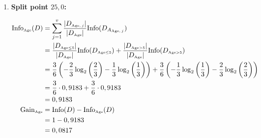 \documentclass[
english,
smallborders
]{i6prcsht}
\newcommand{\OfSpecificValue}[3]{_{\text{\tiny #1#2#3}}}
\newcommand{\OfAttribute}[1]{_{\text{\tiny #1}}}
\begin{document}
\begin{solution}
\begin{enumerate}
\begin{enumerate}
\begin{enumerate}
\begin{enumerate}
					                  \item \textbf{Split point $25,0$:}
					                        
					                        \begin{alignat*}{2}
						                        \text{Info}\OfAttribute{Age}(D) & = \sum_{j=1}^v \frac{|D\OfAttribute{Age$,j$}|}{|D\OfAttribute{Age}|} \text{Info}(D_{A\OfAttribute{Age$,j$}})                                                                                                                            \\
						                                                        & = \frac{|D\OfSpecificValue{Age}{$\leq$}{5}|}{|D\OfAttribute{Age}|} \text{Info}(D\OfSpecificValue{Age}{$\leq$}{5}) + \frac{|D\OfSpecificValue{Age}{$>$}{5}|}{|D\OfAttribute{Age}|} \text{Info}(D\OfSpecificValue{Age}{$>$}{5})           \\
						                                                        & = \frac{3}{6} \left(-\frac{2}{3} \log_2\left(\frac{2}{3}\right) - \frac{1}{3} \log_2\left(\frac{1}{3}\right)\right) + \frac{3}{6} \left(-\frac{1}{3} \log_2\left(\frac{1}{3}\right) - \frac{2}{3} \log_2\left(\frac{2}{3}\right)\right) \\
						                                                        & = \frac{3}{6} \cdot 0,9183 + \frac{3}{6} \cdot 0,9183                                                                                                                                                                                   \\
						                                                        & = 0,9183                                                                                                                                                                                                                                \\
						                        \text{Gain}\OfAttribute{Age}    & = \text{Info}(D) - \text{Info}\OfAttribute{Age}(D)                                                                                                                                                                                      \\
						                                                        & = 1 - 0,9183                                                                                                                                                                                                                            \\
						                                                        & = 0,0817                                                                                                                                                                                                                                \\
					                        \end{alignat*}
					                        

\end{enumerate}
\end{enumerate}
\end{enumerate}
\end{enumerate}
\end{solution}
\end{document}

